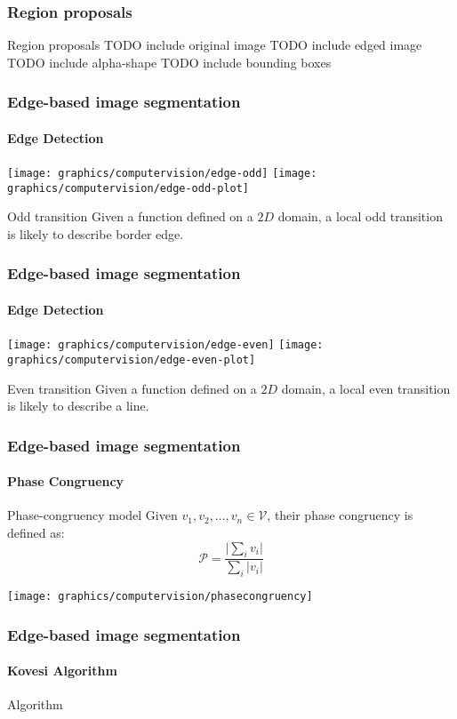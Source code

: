 \subsubsection{Region proposals}
\begin{frame}{Region proposals}
    TODO include original image
    TODO include edged image
    TODO include alpha-shape
    TODO include bounding boxes
\end{frame}

\begin{frame}
    \frametitle{Edge-based image segmentation}
    \framesubtitle{Edge Detection}
    \texttt{[image: graphics/computervision/edge-odd]}
    \texttt{[image: graphics/computervision/edge-odd-plot]}
    \begin{exampleblock}{Odd transition}
        Given a function defined on a $2D$ domain, a local odd transition is likely to describe border edge.
    \end{exampleblock}
\end{frame}

\begin{frame}
    \frametitle{Edge-based image segmentation}
    \framesubtitle{Edge Detection}
    \texttt{[image: graphics/computervision/edge-even]}
    \texttt{[image: graphics/computervision/edge-even-plot]}
    \begin{exampleblock}{Even transition}
        Given a function defined on a $2D$ domain, a local even transition is likely to describe a line.
    \end{exampleblock}
\end{frame}
    
\begin{frame}
    \frametitle{Edge-based image segmentation}
    \framesubtitle{Phase Congruency}
    \begin{block}{Phase-congruency model}
        Given $v_1, v_2, \ldots, v_n \in \mathcal{V}$, their phase congruency is defined as:
        \begin{equation}
            \mathcal{P} = \frac{\lvert \sum_{i} v_i \rvert}{\sum_{i} \lvert v_i \rvert}
        \end{equation}
    \end{block}
    \centering
    \texttt{[image: graphics/computervision/phasecongruency]}
\end{frame}

\begin{frame}
	\frametitle{Edge-based image segmentation}
	\framesubtitle{Kovesi Algorithm}
	Algorithm
\end{frame}

